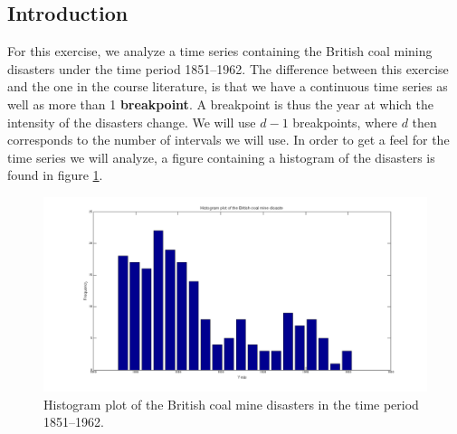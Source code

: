 \subsection*{Introduction}

For this exercise, we analyze a time series containing the British coal mining disasters under the time period 1851--1962. The difference between this exercise and the one in the course literature, is that we have a continuous time series as well as more than 1 \textbf{breakpoint}. A breakpoint is thus the year at which the intensity of the disasters change. We will use $d-1$ breakpoints, where $d$ then corresponds to the number of intervals we will use. In order to get a feel for the time series we will analyze, a figure containing a histogram of the disasters is found in figure \ref{fig:disasters}.

\begin{figure}[H]
  \centering
    \includegraphics[scale=0.24]{./Figures/disasters.png}
  \caption[An Electron]{Histogram plot of the British coal mine disasters in the time period 1851--1962.}
  \label{fig:disasters}
\end{figure}

